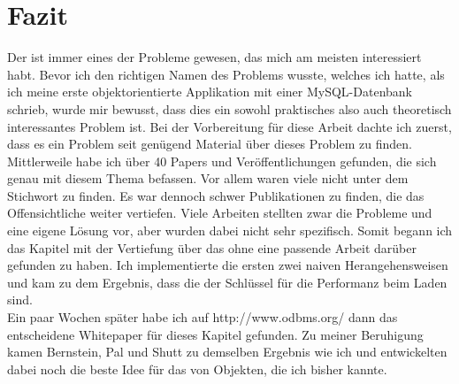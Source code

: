 \chapter{Fazit}

Der \IM ist immer eines der Probleme gewesen, das mich am meisten interessiert habt. Bevor ich den richtigen Namen des Problems wusste, welches ich hatte, als ich meine erste objektorientierte Applikation mit einer MySQL-Datenbank schrieb, wurde mir bewusst, dass dies ein sowohl praktisches also auch theoretisch interessantes Problem ist. Bei der Vorbereitung für diese Arbeit dachte ich zuerst, dass es ein Problem seit genügend Material über dieses Problem zu finden. Mittlerweile habe ich über 40 Papers und Veröffentlichungen gefunden, die sich genau mit diesem Thema befassen. Vor allem waren viele nicht unter dem Stichwort \IMfull zu finden. Es war dennoch schwer Publikationen zu finden, die das Offensichtliche weiter vertiefen. Viele Arbeiten stellten zwar die Probleme und eine eigene Lösung vor, aber wurden dabei nicht sehr spezifisch. Somit begann ich das Kapitel mit der Vertiefung über das  ohne eine passende Arbeit darüber gefunden zu haben. Ich implementierte die ersten zwei naiven Herangehensweisen und kam zu dem Ergebnis, dass die  der Schlüssel für die Performanz beim Laden sind.\\
Ein paar Wochen später habe ich auf http://www.odbms.org/ dann das entscheidene Whitepaper \cite{Bernstein99context-basedprefetch} für dieses Kapitel gefunden. Zu meiner Beruhigung kamen Bernstein, Pal und Shutt zu demselben Ergebnis wie ich und entwickelten dabei noch die beste Idee für das  von Objekten, die ich bisher kannte. \\

